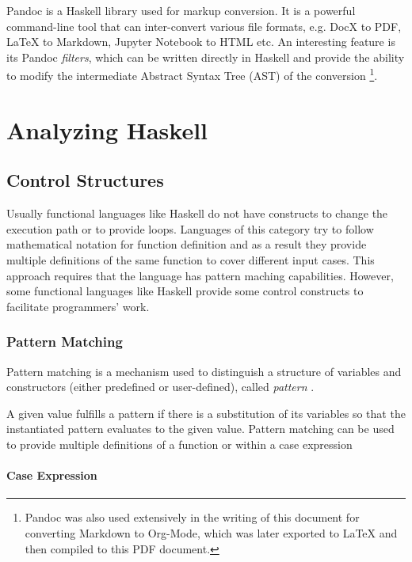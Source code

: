 \documentclass[a4paper, titlepage, twoside]{article}
\begin{document}
Pandoc is a Haskell library used for markup conversion. It is a powerful command-line tool that can inter-convert various file formats, e.g. DocX to PDF, \LaTeX{} to Markdown, Jupyter Notebook to HTML etc. An interesting feature is its Pandoc \emph{filters}, which can be written directly in Haskell and provide the ability to modify the intermediate Abstract Syntax Tree (AST) of the conversion \autocite{macfarlanePandoc2023}\footnote{Pandoc was also used extensively in the writing of this document for converting Markdown to Org-Mode, which was later exported to \LaTeX{} and then compiled to this PDF document.}.

\section{Analyzing Haskell}
\label{sec:orgb6c60c1}

\subsection{Control Structures}
\label{sec:org8bbe20b}

Usually functional languages like Haskell do not have constructs to change the execution path or to provide loops. Languages of this category try to follow mathematical notation for function definition and as a result they provide multiple definitions of the same function to cover different input cases. This approach requires that the language has pattern maching capabilities. However, some functional languages like Haskell provide some control constructs to facilitate programmers' work.

\subsubsection{Pattern Matching}
\label{sec:org809663c}

Pattern matching is a mechanism used to distinguish a structure of variables and constructors (either predefined or user-defined), called \emph{pattern} \autocite[chapter 3.17]{marlowHaskell2010Language2010}.

A given value fulfills a pattern if there is a substitution of its variables so that the instantiated pattern evaluates to the given value. Pattern matching can be used to provide multiple definitions of a function or within a case expression

\paragraph*{Case Expression}
\label{sec:org278f951}
\end{document}
